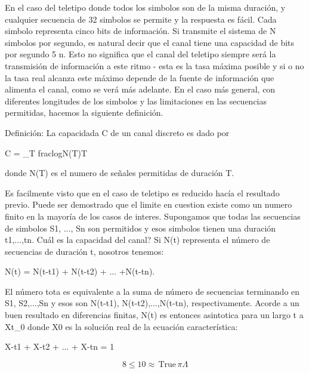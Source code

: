 En el caso del teletipo donde todos los simbolos son de la misma
duración, y cualquier secuencia de 32 simbolos se permite y la
respuesta es fácil. Cada simbolo representa cinco bits de información.
Si transmite el sistema de N simbolos por segundo, es natural decir
que el canal tiene una capacidad de bits por segundo 5 n. Esto no
significa que el canal del teletipo siempre será la transmisión de
información a este ritmo - esta es la tasa máxima posible y si o no la
tasa real alcanza este máximo depende de la fuente de información que
alimenta el canal, como se verá más adelante. En el caso más general,
con diferentes longitudes de los simbolos y las limitaciones en las
secuencias permitidas, hacemos la siguiente definición.

Definición: La capacidada C de un canal discreto es dado por

            C = \im_{T \rightarrow \infty} frac{logN(T)}{T}
    
donde N(T) es el numero de señales permitidas de duración T.

Es facilmente visto que en el caso de teletipo es reducido hacía el
resultado previo. Puede ser demostrado que el limite en cuestion
existe como un numero finito en la mayoría de los casos de interes.
Supongamos que todas las secuencias de simbolos S1, ..., Sn son
permitidos y esos simbolos tienen una duración t1,...,tn. Cuál es la
capacidad del canal? Si N(t) representa el número de secuencias de
duración t, nosotros tenemos:

         N(t) = N(t-t1) + N(t-t2) + ... +N(t-tn).

El número tota es equivalente a la suma de número de secuencias
terminando en S1, S2,...,Sn y esos son N(t-t1), N(t-t2),...,N(t-tn),
respectivamente. Acorde a un buen resultado en diferencias finitas,
N(t) es entonces asintotica para un largo t a Xt_0 donde X0 es la
solución real de la ecuación característica:

         X-t1 + X-t2 + ... + X-tn = 1

\begin{equation}
8 \leq 10 \approx \, \text{True} \, \pi \Lambda
\end{equation}
